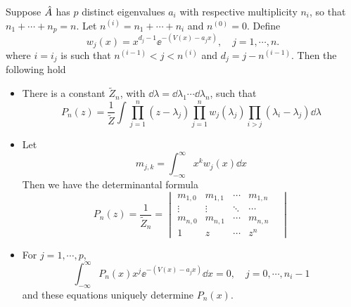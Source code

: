 \begin{prop} Suppose $\hat A$ has $p$ distinct eigenvalues $a_i$ with respective multiplicity $n_i$, so that $n_1 + \cdots + n_p = n$. Let $n^{(i)} = n_1 + \cdots + n_i$ and $n^{(0)} = 0$. Define
	\begin{equation}
		w_j(x) = x^{d_j -1} \ee^{-(V(x) - a_j x)}, \quad j = 1, \cdots, n.
	\end{equation}
	where $i = i_j$ is such that $n^{(i-1)} < j < n^{(i)}$ and $d_j = j - n^{(i-1)}$. Then the following hold
	\begin{itemize}
		\item There is a constant $\tilde{Z}_n$, with $\dd \lambda = \dd \lambda_1 \cdots \dd \lambda_n$, such that
		\begin{equation}
			P_n(z) = \frac{1}{\tilde{Z}} \int \prod_{j=1}^{n} (z - \lambda_j) \prod_{j=1}^{n} w_j(\lambda_j) \prod_{i > j} (\lambda_i - \lambda_j) \dd \lambda
		\end{equation}
		\item Let 
		\begin{equation}
			m_{j,k} = \int_{-\infty}^{\infty} x^k w_j(x) \dd x
		\end{equation} 
		Then we have the determinantal formula
		\begin{equation}
			P_n(z) = \frac{1}{\tilde{Z}_n} = 
			\begin{vmatrix}
				m_{1,0} & m_{1,1} & \cdots & m_{1,n}\\
				\vdots & \vdots & \ddots & \cdots \\
				m_{n,0} & m_{n,1} & \cdots & m_{n,n} & \\
				1 & z & \cdots & z^n
			\end{vmatrix}
		\end{equation}
		\item For $j = 1, \cdots, p$,
		\begin{equation}
			\int_{-\infty}^{\infty} P_n(x) x^j  \ee^{-(V(x) - a_j x)} \dd x = 0, \quad j = 0, \cdots, n_i-1
		\end{equation}
		and these equations uniquely determine $P_n(x)$.
	\end{itemize}
\end{prop}

